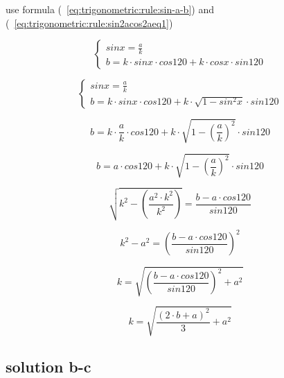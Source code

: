 \documentclass[unicode, 12pt, a4paper]{article}
\begin{document}
use formula (~\ref{eq:trigonometric:rule:sin-a-b}) and (~\ref{eq:trigonometric:rule:sin2acos2aeq1})

\begin{equation}
  \begin{cases}
    sin x = \frac{a}{k}\\
    b = k \cdot sin x \cdot cos 120 + k \cdot cos x \cdot sin 120
  \end{cases}
\end{equation}


\begin{equation}
  \begin{cases}
    sin x = \frac{a}{k}\\
    b = k \cdot sin x \cdot cos 120 + k \cdot \sqrt{1 - sin^2 x} \cdot sin 120
  \end{cases}
\end{equation}


\begin{equation}
  b = k \cdot \frac{a}{k} \cdot cos 120 + k \cdot \sqrt{1 - \left(\frac{a}{k}\right)^2} \cdot sin 120
\end{equation}

\begin{equation}
  b = a \cdot cos 120 + k \cdot \sqrt{1 - \left(\frac{a}{k}\right)^2} \cdot sin 120
\end{equation}

\begin{equation}
  \sqrt{k^2 - \left(\frac{a^2 \cdot k^2}{k^2}\right)} =  \frac{b - a \cdot cos 120}{sin 120}
\end{equation}

\begin{equation}
  k^2 - a^2  =  \left(\frac{b - a \cdot cos 120}{sin 120}\right)^2
\end{equation}

\begin{equation}
  k = \sqrt{\left(\frac{b - a \cdot cos 120}{sin 120}\right)^2 + a^2}
\end{equation}

\begin{equation}
  k = \sqrt{\frac{(2 \cdot b + a)^2}{3} + a^2}
\end{equation}





\subsection{solution b-c}
\end{document}
